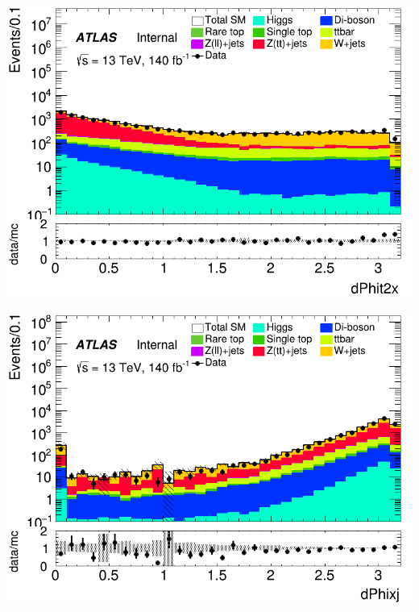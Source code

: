 \documentclass[usenames,dvipsnames]{beamer}
\begin{document}
\begin{frame}
    \begin{minipage}{0.32\textwidth}
        \centering
        \includegraphics[width=\textwidth]{graphics/HH_met/HH_met_dPhit2x.png}
    \end{minipage}
    \hfill
    \begin{minipage}{0.32\textwidth}
        \centering
        \includegraphics[width=\textwidth]{graphics/HH_met/HH_met_dPhixj.png}
    \end{minipage}
    \hfill
    \begin{minipage}{0.32\textwidth}
        \centering

\end{minipage}
\end{frame}
\end{document}
